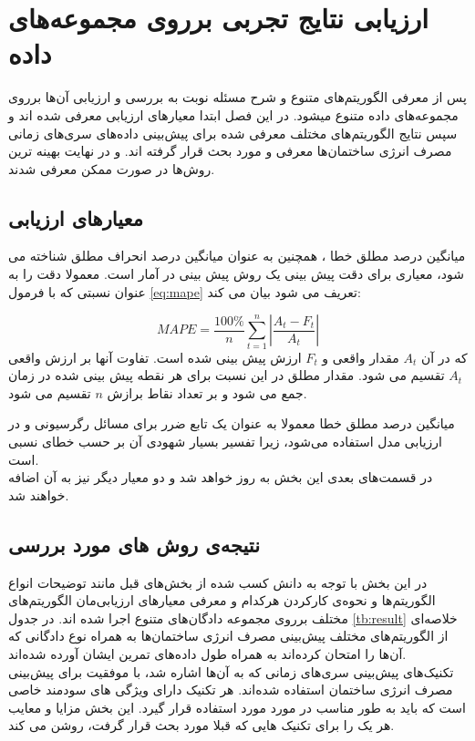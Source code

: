 \chapter{ارزیابی نتایج تجربی برروی مجموعه‌های داده}

پس از معرفی الگوریتم‌های متنوع و شرح مسئله نوبت به بررسی و ارزیابی آن‌ها برروی مجموعه‌های داده‌ متنوع میشود. در این فصل ابتدا معیار‌های ارزیابی معرفی شده اند و سپس 
نتایج الگوریتم‌های مختلف معرفی شده برای پیش‌بینی داده‌های سری‌های زمانی مصرف انرژی ساختمان‌ها معرفی و مورد بحث قرار گرفته اند.
و در نهایت بهینه ترین روش‌ها در صورت ممکن معرفی شدند.
\section{معیار‌های ارزیابی}

میانگین درصد مطلق خطا ، همچنین به عنوان میانگین درصد انحراف مطلق 
 شناخته می شود، معیاری برای دقت پیش بینی یک روش پیش بینی در آمار است. معمولا دقت را به عنوان نسبتی که با فرمول \ref{eq:mape} تعریف می شود بیان می کند:

 \begin{equation}\label{eq:mape}
    MAPE = \frac{100\%}{n}\sum_{t=1}^{n}\left |\frac{A_t - F_t}{A_t}\right|
\end{equation}
\noindent
که در آن $A_t$ مقدار واقعی و $F_t$ ارزش پیش بینی شده است. تفاوت آنها بر ارزش واقعی $A_t$ تقسیم می شود. مقدار مطلق در این نسبت برای هر نقطه پیش بینی شده
 در زمان جمع می شود
 و بر تعداد نقاط برازش $n$ تقسیم می شود.

 
 \noindent
 میانگین درصد مطلق خطا معمولا به عنوان یک تابع ضرر برای مسائل رگرسیونی و در ارزیابی مدل استفاده می‌شود،
 زیرا تفسیر بسیار شهودی آن بر حسب خطای نسبی است.
 \\
 در قسمت‌های بعدی این بخش به روز خواهد شد و دو معیار دیگر نیز به آن اضافه خواهند شد.

\section{نتیجه‌ی روش های مورد بررسی}
در این بخش با توجه به دانش کسب شده از بخش‌های قبل 
مانند توضیحات انواع الگوریتم‌ها و نحوه‌ی کارکردن هرکدام و معرفی معیار‌های ارزیابی‌مان الگوریتم‌های مختلف  برروی مجموعه دادگان‌های متنوع اجرا شده اند.
در جدول \ref{tb:result}
خلاصه‌ای از الگوریتم‌های مختلف پیش‌بینی مصرف انرژی ساختمان‌ها به همراه نوع دادگانی که ‌آن‌ها را امتحان کرده‌اند به همراه طول داده‌های تمرین ایشان آورده شده‌اند. 
\\
تکنیک‌های پیش‌بینی سری‌های زمانی که به آن‌ها اشاره شد، با موفقیت برای پیش‌بینی مصرف انرژی ساختمان استفاده شده‌اند. هر تکنیک دارای ویژگی های سودمند خاصی است که باید به طور مناسب در مورد مورد استفاده قرار گیرد. 
این بخش مزایا و معایب هر یک را برای تکنیک هایی که قبلا مورد بحث قرار گرفت، روشن می کند.

